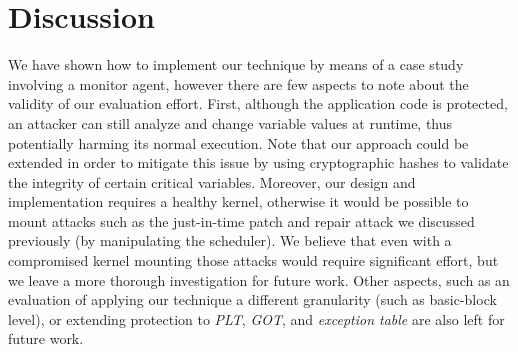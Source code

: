 \section{Discussion}
\label{sec:discussion_packing}

We have shown how to implement our technique by means of a case study involving 
a monitor agent, however there are few aspects to note about the validity of 
our evaluation effort.
First, although the application code is protected, 
an attacker can still analyze and change variable values at runtime, thus 
potentially harming its normal execution.
Note that our approach could be extended in order to mitigate this issue by 
using cryptographic hashes to validate the integrity of certain critical 
variables.
Moreover, our design and implementation requires a healthy kernel, otherwise it 
would be possible to mount attacks such as the just-in-time patch and repair 
attack we discussed previously (by manipulating the scheduler). We believe  
that even with a compromised kernel mounting those attacks would require 
significant effort, but we leave a more thorough investigation for future work. 
Other aspects, such as an evaluation of applying our technique a different 
granularity (such as basic-block level), or extending protection to 
\emph{PLT}, \emph{GOT}, and \emph{exception table} are also left for future 
work.

